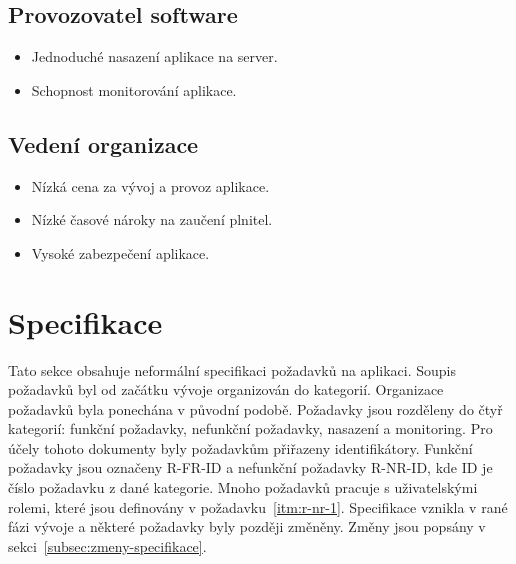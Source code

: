 \subsection*{Provozovatel software}\label{subsec:provozovatel-spravce-software}

\begin{itemize}
    \item
    Jednoduché nasazení aplikace na server.
    \item
    Schopnost monitorování aplikace.
\end{itemize}

\subsection*{Vedení organizace}\label{subsec:vedeni-organizace}

\begin{itemize}
    \item
    Nízká cena za vývoj a provoz aplikace.
    \item
    Nízké časové nároky na zaučení plnitel.
    \item
    Vysoké zabezpečení aplikace.
\end{itemize}


\section{Specifikace}\label{sec:specifikace}

Tato sekce obsahuje neformální specifikaci požadavků na aplikaci.
Soupis požadavků byl od začátku vývoje organizován do kategorií.
Organizace požadavků byla ponechána v původní podobě.
Požadavky jsou rozděleny do čtyř kategorií: funkční požadavky, nefunkční požadavky, nasazení a monitoring.
Pro účely tohoto dokumenty byly požadavkům přiřazeny identifikátory.
Funkční požadavky jsou označeny R-FR-ID a nefunkční požadavky R-NR-ID, kde ID je číslo požadavku z dané kategorie.
Mnoho požadavků pracuje s uživatelskými rolemi, které jsou definovány v požadavku~\ref{itm:r-nr-1}.
Specifikace vznikla v rané fázi vývoje a některé požadavky byly později změněny.
Změny jsou popsány v sekci~\ref{subsec:zmeny-specifikace}.

